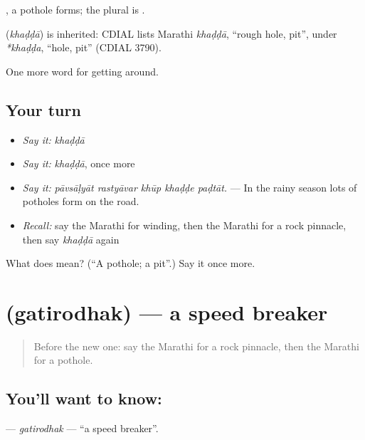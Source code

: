  , a pothole forms; the plural is .

\begin{cousinweb}
\textbf{} (\emph{khaḍḍā}) is inherited: CDIAL lists Marathi \emph{khaḍḍā}, \textquotedblleft{}rough hole, pit\textquotedblright{}, under \emph{*khaḍḍa}, \textquotedblleft{}hole, pit\textquotedblright{} (CDIAL 3790).
\end{cousinweb}

\begin{grammarlens}[title={What you've built}]
One more word for getting around.
\end{grammarlens}

\subsection*{Your turn}
\begin{itemize}
\raggedright
  \item \emph{Say it:} \emph{khaḍḍā}
  \item \emph{Say it:} \emph{khaḍḍā}, once more
  \item \emph{Say it:} \emph{pāvsāḷyāt rastyāvar khūp khaḍḍe paḍtāt.} — In the rainy season lots of potholes form on the road.
  \item \emph{Recall:} say the Marathi for winding, then the Marathi for a rock pinnacle, then say \emph{khaḍḍā} again
\end{itemize}

\begin{tcolorbox}[breakable,colback=teal!4,colframe=teal!35!black,title={Before you move on}]
What does  mean? (\textquotedblleft{}A pothole; a pit\textquotedblright{}.) Say it once more.
\end{tcolorbox}
\section[\texorpdfstring{\mr{गतिरोधक} (gatirodhak)}{गतिरोधक (gatirodhak)}]{ (gatirodhak) — a speed breaker}

\label{lesson:MR-C403-gatirodhak}



\begin{quote}
Before the new one: say the Marathi for a rock pinnacle, then the Marathi for a pothole.
\end{quote}

\subsection*{You'll want to know: }
\textbf{} — \emph{gatirodhak} — \textquotedblleft{}a speed breaker\textquotedblright{}.

